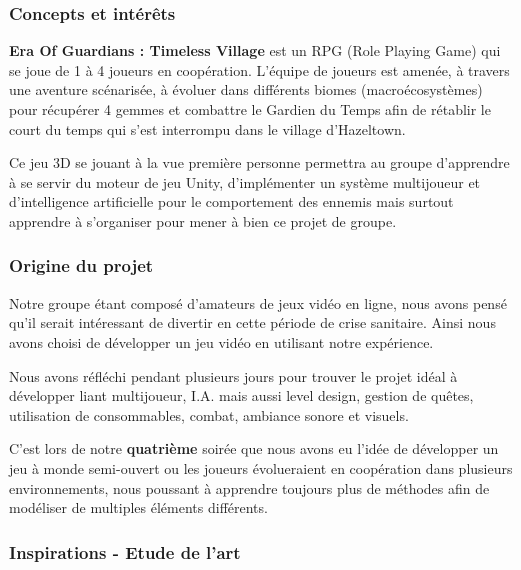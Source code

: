 \documentclass[12pt]{article}
\begin{document}
            \subsubsection{Concepts et intérêts}
                \textbf{Era Of Guardians : Timeless Village} est un RPG (Role Playing Game) qui se joue de 1 à 4 joueurs en coopération. L'équipe de joueurs est amenée, à travers une aventure scénarisée, à évoluer dans différents biomes (macroécosystèmes) pour récupérer 4 gemmes et combattre le Gardien du Temps afin de rétablir le court du temps qui s'est interrompu dans le village d'Hazeltown.
                \\
                \par Ce jeu 3D se jouant à la vue première personne permettra au groupe d'apprendre à se servir du moteur de jeu Unity, d'implémenter un système multijoueur et d'intelligence artificielle pour le comportement des ennemis mais surtout apprendre à s'organiser pour mener à bien ce projet de groupe.
                \\
                
            \subsubsection{Origine du projet}
                Notre groupe étant composé d'amateurs de jeux vidéo en ligne, nous avons pensé qu'il serait intéressant de divertir en cette période de crise sanitaire. Ainsi nous avons choisi de développer un jeu vidéo en utilisant notre expérience.
                \\
                \par Nous avons réfléchi pendant plusieurs jours pour trouver le projet idéal à développer liant multijoueur, I.A. mais aussi level design, gestion de quêtes, utilisation de consommables, combat, ambiance sonore et visuels.
                \\
                \par C'est lors de notre \textbf{quatrième} soirée que nous avons eu l'idée de développer un jeu à monde semi-ouvert ou les joueurs évolueraient en coopération dans plusieurs environnements, nous poussant à apprendre toujours plus de méthodes afin de modéliser de multiples éléments différents.
            
                \clearpage
                
            \subsubsection{Inspirations - Etude de l'art}
                
\end{document}
